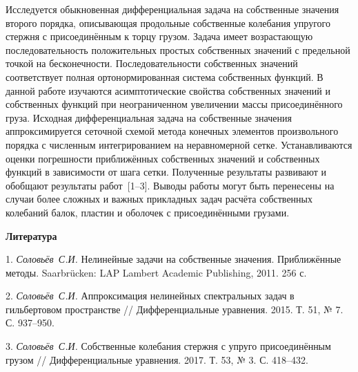 \vzmscaption


Исследуется обыкновенная дифференциальная задача на собственные значения второго порядка,
описывающая продольные собственные колебания упругого стержня с присоединённым к торцу грузом.
Задача имеет возрастающую последовательность положительных простых собственных значений
с предельной точкой на бесконечности.
Последовательности собственных значений соответствует полная ортонормированная система
собственных функций.
В данной работе изучаются асимптотические свойства собственных значений и собственных функций
при неограниченном увеличении
массы присоединённого груза.
Исходная дифференциальная задача на собственные значения аппроксимируется
сеточной схемой метода конечных элементов произвольного порядка с численным интегрированием на неравномерной сетке.
Устанавливаются оценки погрешности приближённых собственных значений
и собственных функций в зависимости от шага сетки.
Полученные результаты развивают и обобщают результаты работ~[1--3].
Выводы работы могут быть перенесены на случаи
более сложных и важных прикладных задач расчёта собственных колебаний балок, пластин и оболочек
с присоединёнными грузами.



\smallskip \centerline {\bf Литература} \nopagebreak

1. {\it Соловьёв~С.И.}
Нелинейные задачи на собственные значения. Приближённые методы.
Saarbr\"ucken: LAP Lambert Academic Publishing, 2011. 256 с.

2. {\it Соловьёв~С.И.}
Аппроксимация нелинейных спектральных задач в гильбертовом пространстве
// Дифференциальные уравнения. 2015. Т. 51,
№ 7. С. 937--950.

3. {\it Соловьёв~С.И.}
Собственные колебания стержня с упруго присоединённым грузом
// Дифференциальные уравнения. 2017. Т. 53,
№ 3. С. 418--432.
